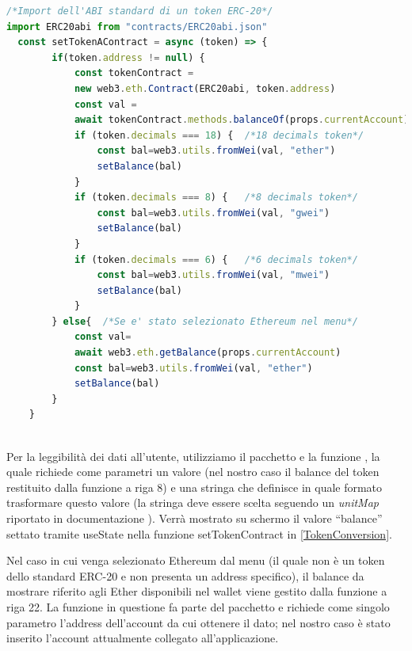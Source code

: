 \begin{lstlisting}[caption={[Token Conversion Code]},language=jsx] 
/*Import dell'ABI standard di un token ERC-20*/
import ERC20abi from "contracts/ERC20abi.json"
  const setTokenAContract = async (token) => {
        if(token.address != null) {
            const tokenContract = 
            new web3.eth.Contract(ERC20abi, token.address)
            const val = 
            await tokenContract.methods.balanceOf(props.currentAccount).call()
            if (token.decimals === 18) {  /*18 decimals token*/
                const bal=web3.utils.fromWei(val, "ether")
                setBalance(bal)
            }
            if (token.decimals === 8) {   /*8 decimals token*/
                const bal=web3.utils.fromWei(val, "gwei")
                setBalance(bal)
            }
            if (token.decimals === 6) {   /*6 decimals token*/
                const bal=web3.utils.fromWei(val, "mwei")
                setBalance(bal)
            }
        } else{  /*Se e' stato selezionato Ethereum nel menu*/
            const val=
            await web3.eth.getBalance(props.currentAccount)
            const bal=web3.utils.fromWei(val, "ether")
            setBalance(bal)
        }
    }
    																			       -TokenConversion
\end{lstlisting}\makeatletter{}\makeatother
\label{TokenConversion}

Per la leggibilità dei dati all'utente, utilizziamo il pacchetto  e la funzione , la quale richiede come parametri un valore (nel nostro caso il balance del token restituito dalla funzione  a riga 8) e una stringa che definisce in quale formato trasformare questo valore (la stringa deve essere scelta seguendo un \textit{unitMap} riportato in documentazione \cite{web3API}). Verrà mostrato su schermo il valore “balance” settato tramite useState nella funzione setTokenContract in \ref{TokenConversion}. 

Nel caso in cui venga selezionato Ethereum dal menu (il quale non è un token dello standard ERC-20 e non presenta un address specifico), il balance da mostrare riferito agli Ether disponibili nel wallet viene gestito dalla funzione a riga 22.  La funzione in questione fa parte del pacchetto  e richiede come singolo parametro l'address dell'account da cui ottenere il dato; nel nostro caso è stato inserito l'account attualmente collegato all'applicazione. 

